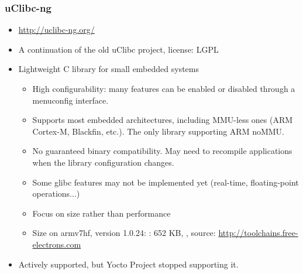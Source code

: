 \begin{frame}
  \frametitle{uClibc-ng}
  \begin{itemize}
  \item \url{http://uclibc-ng.org/}
  \item A continuation of the old uClibc project, license: LGPL
  \item Lightweight C library for small embedded systems
    \begin{itemize}
    \item High configurability: many features can be enabled or
      disabled through a menuconfig interface.
    \item Supports most embedded architectures, including MMU-less
          ones (ARM Cortex-M, Blackfin, etc.). The only library
          supporting ARM noMMU.
    \item No guaranteed binary compatibility. May need to
      recompile applications when the library configuration changes.
    \item Some glibc features may not be implemented yet (real-time,
          floating-point operations...)
    \item Focus on size rather than performance
    \item Size on armv7hf, version 1.0.24:
      : 652 KB, , source: \url{http://toolchains.free-electrons.com}
    \end{itemize}
    \item Actively supported, but Yocto Project stopped supporting it.
  \end{itemize}
\end{frame}

